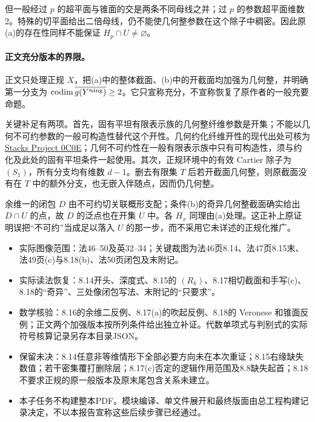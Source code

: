 但一般经过 $p$ 的超平面与锥面的交是两条不同母线之并；过 $p$ 的参数超平面维数2。特殊的切平面给出二倍母线，仍不能使几何整参数在这个除子中稠密。因此原(a)的存在性同样不能保证 $H_p\cap U\ne\varnothing$。

\paragraph{正文充分版本的界限。}
正文只处理正规 $X$，把(a)中的整体截面、(b)中的开截面均加强为几何整，并明确第一分支为 $\operatorname{codim}\overline{g(Y'^{\mathrm{sing}})}\ge2$。它只宣称充分，不宣称恢复了原作者的一般充要命题。

关键补足有两项。首先，固有平坦有限表示族的几何整纤维参数是开集；不能以几何不可约参数的一般可构造性替代这个开性。几何约化纤维开性的现代出处可核为 \href{https://stacks.math.columbia.edu/tag/0C0E}{Stacks Project 0C0E}；几何不可约性在一般有限表示族中只有可构造性，须与约化及此处的固有平坦条件一起使用。其次，正规环境中的有效 Cartier 除子为 $(S_1)$，所有分支均有维数 $d-1$。删去有限集 $T$ 后若开截面几何整，则原截面没有在 $T$ 中的额外分支，也无嵌入伴随点，因而仍几何整。

余维一的闭包 $D$ 由不可约切关联概形支配；条件(b)的奇异几何整截面确实给出 $D\cap U$ 的点，故 $D$ 的泛点也在开集 $U$ 中。各 $H_x$ 同理由(a)处理。这正补上原证明误把“不可约”当成足以落入 $U$ 的那一步，而不采用它未详述的正规化推广。

\begin{itemize}
\item 实际图像范围：法46--50及英32--34；关键裁图为法46页8.14、法47页8.15末、法49页(c)与8.18(b)、法50页闭包及末附记。
\item 实际读法恢复：8.14开头、深度式、8.15的 $(R_k)$、8.17相切截面和手写(c)、8.18的“奇异”、三处像闭包写法、末附记的“只要求”。
\item 数学核验：8.16的余维二反例、8.17(a)的吹起反例、8.18的 Veronese 和锥面反例；正文两个加强版本按所列条件给出独立补证。代数单项式与判别式的实际符号核算记录另存本目录JSON。
\item 保留未决：8.14任意非等维情形下全部必要方向未在本次重证；8.15右缘缺失数值；若干密集覆打删除层；8.17(c)否定的逻辑作用范围及8.8缺失起首；8.18不要求正规的原一般版本及原末尾包含关系未建立。
\item 本子任务不构建整本PDF。模块编译、单文件展开和最终版面由总工程构建记录决定，不以本报告宣称这些后续步骤已经通过。
\end{itemize}

